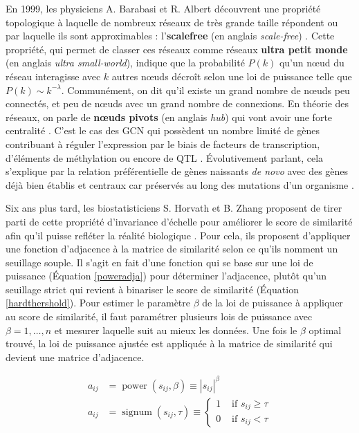 En 1999, les physiciens A. Barabasi et R. Albert découvrent une propriété topologique à laquelle de nombreux réseaux de très grande taille répondent ou par laquelle ils sont approximables \cite{Broido2019Mar} : l'\textbf{\gls{scalefree}} (en anglais \textit{scale-free}) \cite{Barabasi1999Oct}. Cette propriété, qui permet de classer ces réseaux comme réseaux \textbf{ultra petit monde} \cite{Cohen2003Feb} (en anglais \textit{ultra small-world}), indique que la probabilité $P(k)$ qu'un nœud du réseau interagisse avec $k$ autres nœuds décroît selon une loi de puissance telle que $P(k) \sim k^{-\lambda}$. Communément, on dit qu'il existe un grand nombre de nœuds peu connectés, et peu de nœuds avec un grand nombre de connexions. En théorie des réseaux, on parle de \textbf{nœuds pivots} (en anglais \textit{hub}) qui vont avoir une forte centralité \cite{VanDam2018}. C'est le cas des \acrshort{GCN} qui possèdent un nombre limité de gènes contribuant à réguler l'expression par le biais de facteurs de transcription, d'éléments de méthylation ou encore de \acrshort{QTL} \cite{Serin2016}. Évolutivement parlant, cela s'explique par la relation préférentielle de gènes naissants \textit{de novo} avec des gènes déjà bien établis et centraux car préservés au long des mutations d'un \gls{organisme} \cite{Barabasi2004}.


Six ans plus tard, les biostatisticiens S. Horvath et B. Zhang proposent de tirer parti de cette propriété d'invariance d'échelle pour améliorer le score de similarité afin qu'il puisse refléter la réalité biologique \cite{Zhang2005a}. Pour cela, ils proposent d'appliquer une fonction d'adjacence à la matrice de similarité selon ce qu'ils nomment un seuillage souple. Il s'agit en fait d'une fonction qui se base sur une loi de puissance (Équation \ref{poweradja}) pour déterminer l'adjacence, plutôt qu'un seuillage strict qui revient à binariser le score de similarité (Équation \ref{hardthershold}). Pour estimer le paramètre $\beta$ de la loi de puissance à appliquer au score de similarité, il faut paramétrer plusieurs lois de puissance avec $\beta = 1, \dots, n$ et mesurer laquelle suit au mieux les données. Une fois le $\beta$ optimal trouvé, la loi de puissance ajustée est appliquée à la matrice de similarité qui devient une matrice d'adjacence. 

\begin{align} 
    a_{i j} &= \operatorname{power}\left(s_{i j}, \beta\right) \equiv\left|s_{i j}\right|^{\beta} \label{poweradja} \\
    a_{i j} &= \operatorname{signum}\left(s_{i j}, \tau\right) \equiv \begin{cases}1 & \text { if } s_{i j} \geq \tau \\ 0 & \text { if } s_{i j}<\tau\end{cases} \label{hardthershold}
\end{align}

